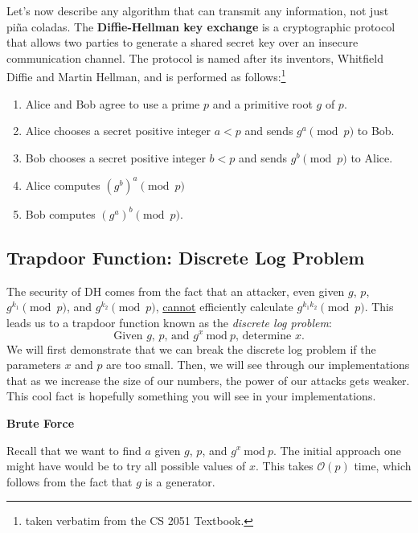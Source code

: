 \documentclass{article}
\begin{document}
    \vspace{3mm}
    Let's now describe any algorithm that can transmit any information, not just piña coladas. The \textbf{Diffie-Hellman key exchange} is a cryptographic protocol that allows two parties to generate a shared secret key over an insecure communication channel. The protocol is named after its inventors, Whitfield Diffie and Martin Hellman, and is performed as follows:\footnote{taken verbatim from the CS 2051 Textbook.}
    \begin{enumerate}[label = \arabic*.]
        \item Alice and Bob agree to use a prime $p$ and a primitive root $g$ of $p$.
        \item Alice chooses a secret positive integer $a < p$ and sends $g^{a} \pmod{p}$ to Bob.
        \item Bob chooses a secret positive integer $b < p$ and sends $g^{b} \pmod{p}$ to Alice.
        \item Alice computes $(g^{b})^{a} \pmod{p}$
        \item Bob computes $(g^{a})^{b}\pmod{p}$.
    \end{enumerate}

\subsection*{Trapdoor Function: Discrete Log Problem}
    The security of DH comes from the fact that an attacker, even given $g$, $p$, $g^{k_{1}} \pmod{p}$, and $g^{k_{2}} \pmod{p}$, \underline{cannot} efficiently calculate $g^{k_{1} k_{2}} \pmod{p}$. This leads us to a trapdoor function known as the \textit{discrete log problem}: $$\text{Given $g$, $p$, and $g^{x}\ \text{mod}\ p$, determine $x$}.$$ We will first demonstrate that we can break the discrete log problem if the parameters $x$ and $p$ are too small. Then, we will see through our implementations that as we increase the size of our numbers, the power of our attacks gets weaker. This cool fact is hopefully something you will see in your implementations.

    \begin{center}
        \textbf{Brute Force}
    \end{center}

    Recall that we want to find $a$ given $g$, $p$, and $g^{x}\ \text{mod}\ p$. The initial approach one might have would be to try all possible values of $x$. This takes $\mathcal{O}(p)$ time, which follows from the fact that $g$ is a generator.
    
\end{document}
